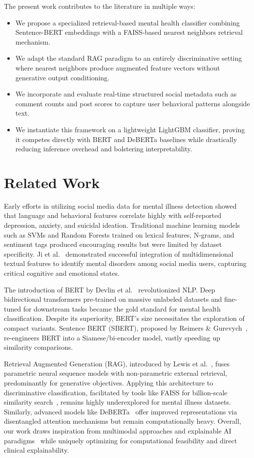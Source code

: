 \documentclass[11pt]{article}
\begin{document}
The present work contributes to the literature in multiple ways:
\begin{itemize}
    \item We propose a specialized retrieval-based mental health classifier combining Sentence-BERT embeddings with a FAISS-based nearest neighbors retrieval mechanism.
    \item We adapt the standard RAG paradigm to an entirely discriminative setting where nearest neighbors produce augmented feature vectors without generative output conditioning.
    \item We incorporate and evaluate real-time structured social metadata such as comment counts and post scores to capture user behavioral patterns alongside text.
    \item We instantiate this framework on a lightweight LightGBM classifier, proving it competes directly with BERT and DeBERTa baselines while drastically reducing inference overhead and bolstering interpretability.
\end{itemize}

\section{Related Work}

Early efforts in utilizing social media data for mental illness detection showed that language and behavioral features correlate highly with self-reported depression, anxiety, and suicidal ideation. Traditional machine learning models such as SVMs and Random Forests trained on lexical features, N-grams, and sentiment tags produced encouraging results but were limited by dataset specificity. Ji et al.~\cite{ji2022} demonstrated successful integration of multidimensional textual features to identify mental disorders among social media users, capturing critical cognitive and emotional states.

The introduction of BERT by Devlin et al.~\cite{devlin2019} revolutionized NLP. Deep bidirectional transformers pre-trained on massive unlabeled datasets and fine-tuned for downstream tasks became the gold standard for mental health classification. Despite its superiority, BERT’s size necessitates the exploration of compact variants. Sentence BERT (SBERT), proposed by Reimers \& Gurevych~\cite{reimers2019}, re-engineers BERT into a Siamese/bi-encoder model, vastly speeding up similarity comparisons.

Retrieval Augmented Generation (RAG), introduced by Lewis et al.~\cite{lewis2020}, fuses parametric neural sequence models with non-parametric external retrieval, predominantly for generative objectives. Applying this architecture to discriminative classification, facilitated by tools like FAISS for billion-scale similarity search~\cite{johnson2021}, remains highly underexplored for mental illness datasets. Similarly, advanced models like DeBERTa~\cite{he2021} offer improved representations via disentangled attention mechanisms but remain computationally heavy. Overall, our work draws inspiration from multimodal approaches and explainable AI paradigms~\cite{guntuku2024} while uniquely optimizing for computational feasibility and direct clinical explainability.
\end{document}
